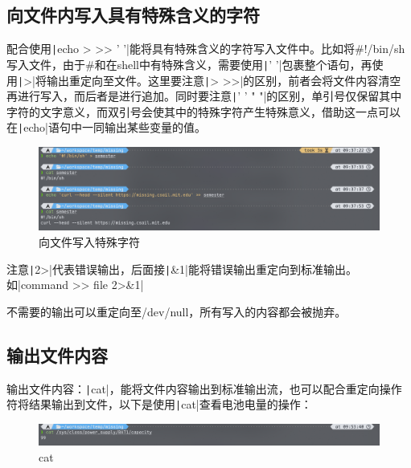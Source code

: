 \documentclass[fontset=ubuntu]{ctexart}
\begin{document}
\begin{sloppypar}
\subsection{向文件内写入具有特殊含义的字符}
配合使用\texttt|echo > >> ' '|能将具有特殊含义的字符写入文件中。比如将\#!/bin/sh写入文件，由于\#和\!在shell中有特殊含义，需要使用\texttt|' '|包裹整个语句，再使用\texttt|>|将输出重定向至文件。这里要注意\texttt|> >>|的区别，前者会将文件内容清空再进行写入，而后者是进行追加。同时要注意\texttt|' ' " "|的区别，单引号仅保留其中字符的文字意义，而双引号会使其中的特殊字符产生特殊意义，借助这一点可以在\texttt|echo|语句中一同输出某些变量的值。
\begin{figure}[htb]
    \centering
    \includegraphics[width=0.75\linewidth]{to_file_1.png}
    \caption{向文件写入特殊字符}
    \label{fig:to_file_1}
\end{figure}

注意\texttt|2>|代表错误输出，后面接\texttt|&1|能将错误输出重定向到标准输出。如|command >> file 2>&1|

不需要的输出可以重定向至/dev/null，所有写入的内容都会被抛弃。

\subsection{输出文件内容}
输出文件内容：\texttt|cat|，能将文件内容输出到标准输出流，也可以配合重定向操作符将结果输出到文件，以下是使用\texttt|cat|查看电池电量的操作：
\begin{figure}[htb]
    \centering
    \includegraphics[width=0.75\linewidth]{cat_1.png}
    \caption{cat}
    \label{fig:cat_1}
\end{figure}


\end{sloppypar}
\end{document}
